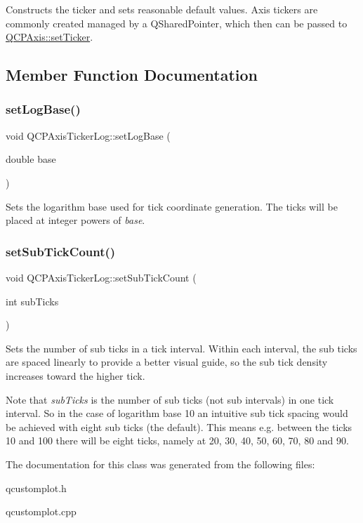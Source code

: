 Constructs the ticker and sets reasonable default values. Axis tickers are commonly created managed by a Q\+Shared\+Pointer, which then can be passed to \hyperlink{class_q_c_p_axis_a4ee03fcd2c74d05cd1a419b9af5cfbdc}{Q\+C\+P\+Axis\+::set\+Ticker}. 

\subsection{Member Function Documentation}
\mbox{\label{class_q_c_p_axis_ticker_log_ac6e3b4e03baea3816f898869ab9751ef}} 
\subsubsection{\texorpdfstring{set\+Log\+Base()}{setLogBase()}}
{\footnotesize\ttfamily void Q\+C\+P\+Axis\+Ticker\+Log\+::set\+Log\+Base (\begin{DoxyParamCaption}\item[{double}]{base }\end{DoxyParamCaption})}

Sets the logarithm base used for tick coordinate generation. The ticks will be placed at integer powers of {\itshape base}. \mbox{\label{class_q_c_p_axis_ticker_log_ad51989c798c0cfd50936d77aac57c56a}} 
\subsubsection{\texorpdfstring{set\+Sub\+Tick\+Count()}{setSubTickCount()}}
{\footnotesize\ttfamily void Q\+C\+P\+Axis\+Ticker\+Log\+::set\+Sub\+Tick\+Count (\begin{DoxyParamCaption}\item[{int}]{sub\+Ticks }\end{DoxyParamCaption})}

Sets the number of sub ticks in a tick interval. Within each interval, the sub ticks are spaced linearly to provide a better visual guide, so the sub tick density increases toward the higher tick.

Note that {\itshape sub\+Ticks} is the number of sub ticks (not sub intervals) in one tick interval. So in the case of logarithm base 10 an intuitive sub tick spacing would be achieved with eight sub ticks (the default). This means e.\+g. between the ticks 10 and 100 there will be eight ticks, namely at 20, 30, 40, 50, 60, 70, 80 and 90. 

The documentation for this class was generated from the following files\+:\begin{DoxyCompactItemize}
\item 
qcustomplot.\+h\item 
qcustomplot.\+cpp\end{DoxyCompactItemize}
